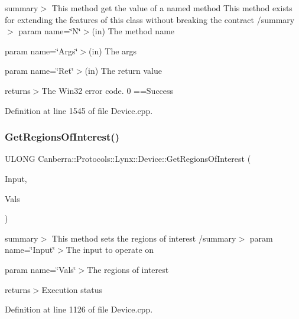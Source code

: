 summary$>$ This method get the value of a named method This method exists for extending the features of this class without breaking the contract /summary$>$ param name=\char`\"{}\+N\char`\"{}$>$(in) The method name

param name=\char`\"{}\+Args\char`\"{}$>$(in) The args

param name=\char`\"{}\+Ret\char`\"{}$>$(in) The return value

returns$>$The Win32 error code. 0 ==Success

Definition at line 1545 of file Device.\+cpp.

\mbox{\label{class_canberra_1_1_protocols_1_1_lynx_1_1_device_ae0f2af17d866f3fc8dace49b3dc25534_ae0f2af17d866f3fc8dace49b3dc25534}} 
\subsubsection{\texorpdfstring{Get\+Regions\+Of\+Interest()}{GetRegionsOfInterest()}}
{\footnotesize\ttfamily U\+L\+O\+NG Canberra\+::\+Protocols\+::\+Lynx\+::\+Device\+::\+Get\+Regions\+Of\+Interest (\begin{DoxyParamCaption}\item[{U\+S\+H\+O\+RT}]{Input,  }\item[{std\+::vector$<$ \hyperlink{class_canberra_1_1_data_types_1_1_spectroscopy_1_1_region_of_interest}{Canberra\+::\+Data\+Types\+::\+Spectroscopy\+::\+Region\+Of\+Interest} $>$ \&}]{Vals }\end{DoxyParamCaption})}

summary$>$ This method sets the regions of interest /summary$>$ param name=\char`\"{}\+Input\char`\"{}$>$The input to operate on

param name=\char`\"{}\+Vals\char`\"{}$>$The regions of interest

returns$>$Execution status

Definition at line 1126 of file Device.\+cpp.

\mbox{\label{class_canberra_1_1_protocols_1_1_lynx_1_1_device_a2db7c8288c3316f23f29bea4948634c4_a2db7c8288c3316f23f29bea4948634c4}} 
